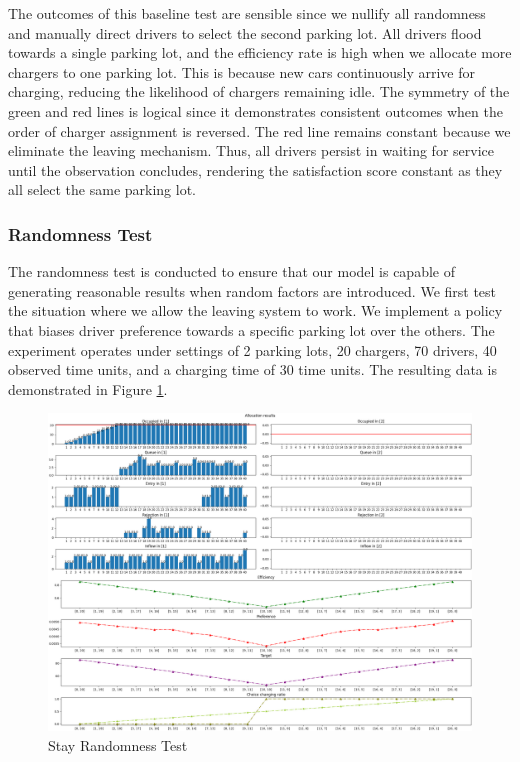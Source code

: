 The outcomes of this baseline test are sensible since we nullify all randomness and manually direct drivers to select the second parking lot. All drivers flood towards a single parking lot, and the efficiency rate is high when we allocate more chargers to one parking lot. This is because new cars continuously arrive for charging, reducing the likelihood of chargers remaining idle. The symmetry of the green and red lines is logical since it demonstrates consistent outcomes when the order of charger assignment is reversed. The red line remains constant because we eliminate the leaving mechanism. Thus, all drivers persist in waiting for service until the observation concludes, rendering the satisfaction score constant as they all select the same parking lot.

\subsubsection{Randomness Test}
The randomness test is conducted to ensure that our model is capable of generating reasonable results when random factors are introduced. We first test the situation where we allow the leaving system to work. We implement a policy that biases driver preference towards a specific parking lot over the others. The experiment operates under settings of 2 parking lots, 20 chargers, 70 drivers, 40 observed time units, and a charging time of 30 time units. The resulting data is demonstrated in Figure \ref{fig:stay_randomness}.
\begin{figure}
    \centering
    \includegraphics[width=\textwidth]{figure/stay_randomness.png}
    \caption{Stay Randomness Test}
    \label{fig:stay_randomness}
\end{figure}